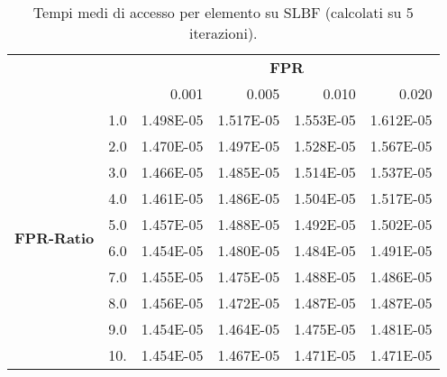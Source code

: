 \documentclass[4apaper,11pt]{report}
\begin{document}
    \begin{table}[H]
        \centering
        \begin{tabular}{llrrrr}
        \toprule
        {} & & \multicolumn{4}{c}{\textbf{FPR}}\\
        {} & &    0.001 &     0.005 &     0.010 &     0.020 \\
        \midrule
        \multirow{10}{*}{\textbf{FPR-Ratio}} &1.0 & 1.498E-05 & 1.517E-05 & 1.553E-05 & 1.612E-05 \\
        &2.0 & 1.470E-05 & 1.497E-05 & 1.528E-05 & 1.567E-05 \\
        &3.0 & 1.466E-05 & 1.485E-05 & 1.514E-05 & 1.537E-05 \\
        &4.0 & 1.461E-05 & 1.486E-05 & 1.504E-05 & 1.517E-05 \\
        &5.0 & 1.457E-05 & 1.488E-05 & 1.492E-05 & 1.502E-05 \\
        &6.0 & 1.454E-05 & 1.480E-05 & 1.484E-05 & 1.491E-05 \\
        &7.0 & 1.455E-05 & 1.475E-05 & 1.488E-05 & 1.486E-05 \\
        &8.0 & 1.456E-05 & 1.472E-05 & 1.487E-05 & 1.487E-05 \\
        &9.0 & 1.454E-05 & 1.464E-05 & 1.475E-05 & 1.481E-05 \\
        &10. & 1.454E-05 & 1.467E-05 & 1.471E-05 & 1.471E-05 \\
        \bottomrule
        \end{tabular}
        \caption{Tempi medi di accesso per elemento su SLBF (calcolati su 5 iterazioni).}

    \end{table}
\end{document}
